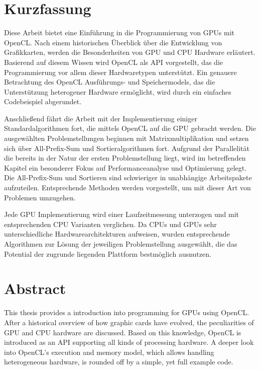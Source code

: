 \chapter*{Kurzfassung}

Diese Arbeit bietet eine Einführung in die Programmierung von GPUs mit OpenCL. Nach einem historischen Überblick über die Entwicklung von Grafikkarten, werden die Besonderheiten von GPU und CPU Hardware erläutert. Basierend auf diesem Wissen wird OpenCL als API vorgestellt, das die Programmierung vor allem dieser Hardwaretypen unterstützt. Ein genauere Betrachtung des OpenCL Ausführungs- und Speichermodels, das die Unterstützung heterogener Hardware ermöglicht, wird durch ein einfaches Codebeispiel abgerundet.

Anschließend fährt die Arbeit mit der Implementierung einiger Standardalgorithmen fort, die mittels OpenCL auf die GPU gebracht werden. Die ausgewählten Problemstellungen beginnen mit Matrixmultiplikation und setzen sich über All-Prefix-Sum und Sortieralgorithmen fort. Aufgrund der Parallelität die bereits in der Natur der ersten Problemstellung liegt, wird im betreffenden Kapitel ein besonderer Fokus auf Performanceanalyse und Optimierung gelegt. Die All-Prefix-Sum und Sortieren sind schwieriger in unabhängige Arbeitspakete aufzuteilen. Entsprechende Methoden werden vorgestellt, um mit dieser Art von Problemen umzugehen.

Jede GPU Implementierung wird einer Laufzeitmessung unterzogen und mit entsprechenden CPU Varianten verglichen. Da CPUs und GPUs sehr unterschiedliche Hardwarearchitekturen aufweisen, wurden entsprechende Algorithmen zur Lösung der jeweiligen Problemstellung ausgewählt, die das Potential der zugrunde liegenden Plattform bestmöglich ausnutzen.

\pagebreak

\chapter*{Abstract}

This thesis provides a introduction into programming for GPUs using OpenCL. After a historical overview of how graphic cards have evolved, the peculiarities of GPU and CPU hardware are discussed. Based on this knowledge, OpenCL is introduced as an API supporting all kinds of processing hardware. A deeper look into OpenCL's execution and memory model, which allows handling heterogeneous hardware, is rounded off by a simple, yet full example code.

